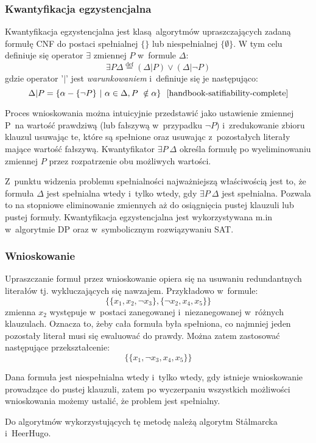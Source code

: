 \subsubsection{Kwantyfikacja egzystencjalna}
Kwantyfikacja egzystencjalna jest klasą algorytmów upraszczających zadaną formułę CNF do postaci spełnialnej $\{\}$ lub niespełnialnej $\{\emptyset\}$.
W tym celu definiuje się operator $\exists$ zmiennej $P$ w~formule $\Delta$:
\[ \exists P \Delta \stackrel{\text{def}}{=} (\Delta | P) \lor (\Delta | \neg P) \]
gdzie operator '$|$' jest \textit{warunkowaniem} i~definiuje się je następująco:
\[ \Delta | P = \{\alpha - \{\neg P\}~|~\alpha \in \Delta, P~\notin \alpha\} ~~\text{\cite{handbook-satifiability-complete}} \] 

Proces wnioskowania można intuicyjnie przedstawić jako ustawienie zmiennej P~na wartość prawdziwą (lub fałszywą w~przypadku $\neg P$)
i~zredukowanie zbioru klauzul usuwając te, które są spełnione oraz usuwając z~pozostałych literały mające wartość fałszywą.
Kwantyfikator $\exists P~\Delta $ określa formułę po wyeliminowaniu zmiennej $P$ przez rozpatrzenie obu możliwych wartości.

Z~punktu widzenia problemu spełnialności najważniejszą właściwością jest to, że formuła $\Delta$ jest spełnialna wtedy i~tylko wtedy, gdy 
$\exists P~\Delta$ jest spełnialna. Pozwala to na stopniowe eliminowanie zmiennych aż do osiągnięcia pustej klauzuli lub pustej formuły. 
Kwantyfikacja egzystencjalna jest wykorzystywana m.in w~algorytmie DP oraz w~symbolicznym rozwiązywaniu SAT.

\subsubsection{Wnioskowanie}
Upraszczanie formuł przez wnioskowanie opiera się na usuwaniu redundantnych literałów tj. wykluczających się nawzajem.
Przykładowo w~formule:
\[ \{\{x_1, x_2, \neg x_3 \},  \{ \neg x_2, x_4, x_5 \}\} \]
zmienna $x_2$ występuje w~postaci zanegowanej i~niezanegowanej w~różnych klauzulach. Oznacza to, żeby cała formuła była spełniona,
co najmniej jeden pozostały literał musi się ewaluować do prawdy. Można zatem zastosować następujące przekształcenie:
  \[ \{\{x_1, \neg x_3, x_4, x_5 \}\} \]
  
Dana formuła jest niespełnialna wtedy i~tylko wtedy, gdy istnieje wnioskowanie prowadzące do pustej klauzuli, zatem po wyczerpaniu
wszystkich możliwości wnioskowania możemy ustalić, że problem jest spełnialny. 

Do algorytmów wykorzystujących tę metodę należą algorytm St{\aa}lmarcka i~HeerHugo.

